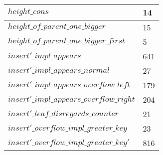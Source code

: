 \begin{tabular}{| l | l |}
$height\_cons$ & 14 \\ \hline
$height\_of\_parent\_one\_bigger$ & 15 \\ \hline
$height\_of\_parent\_one\_bigger\_first$ & 5 \\ \hline
$insert'\_impl\_appears$ & 641 \\ \hline
$insert'\_impl\_appears\_normal$ & 27 \\ \hline
$insert'\_impl\_appears\_overflow\_left$ & 179 \\ \hline
$insert'\_impl\_appears\_overflow\_right$ & 204 \\ \hline
$insert'\_leaf\_disregards\_counter$ & 21 \\ \hline
$insert'\_overflow\_impl\_greater\_key$ & 23 \\ \hline
$insert'\_overflow\_impl\_greater\_key'$ & 816 \\ \hline
\end{tabular}
\newpage
